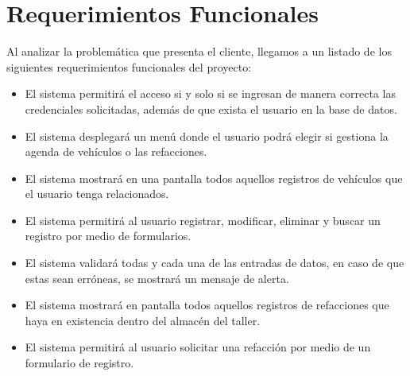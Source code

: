 \section{Requerimientos Funcionales}
Al analizar la problemática que presenta el cliente, llegamos a un listado de los siguientes requerimientos funcionales del proyecto: 
\begin{itemize}
	\item El sistema permitirá el acceso si y solo si se ingresan de manera correcta las credenciales solicitadas, además de que exista el usuario en la base de datos.
	\item El sistema desplegará un menú donde el usuario podrá elegir si gestiona la agenda de vehículos o las refacciones. 
	\item El sistema mostrará en una pantalla todos aquellos registros de vehículos que el usuario tenga relacionados. 
	\item El sistema permitirá al usuario registrar, modificar, eliminar y buscar un registro por medio de formularios. 
	\item El sistema validará todas y cada una de las entradas de datos, en caso de que estas sean erróneas, se mostrará un mensaje de alerta. 
	\item El sistema mostrará en pantalla todos aquellos registros de refacciones que haya en existencia dentro del almacén del taller. 
	\item El sistema permitirá al usuario solicitar una refacción por medio de un formulario de registro. 
\end{itemize}